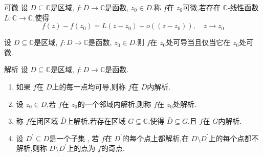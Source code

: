 \documentclass[../../复变函数.tex]{subfiles}
\begin{document}
\begin{definition}{可微}
    设 \(  D\subseteq \mathbb{C}   \)是区域, \(  f:D\to \mathbb{C}   \)是函数, \(  z_0 \in D  \).称 \(  f  \)在 \(  z_0  \)可微,若存在 \(  \mathbb{C}   \)-线性函数 \(  L:\mathbb{C} \to \mathbb{C}   \),使得 \[
    f\left( z \right)-f\left( z_0 \right)=  L\left( z-z_0 \right)+  o\left( \left( z-z_0 \right)  \right),\quad z\to z_0    
    \]    
       
\end{definition}

\begin{proposition}
    设 \(  D\subseteq \mathbb{C}   \)是区域, \(  f:D\to \mathbb{C}   \)是函数, \(  z_0 \in D  \).则 \(  f  \)在 \(  z_0  \)处可导当且仅当它在 \(  z_0  \)处可微.      
\end{proposition}

\begin{definition}{解析}
    设 \(  D\subseteq \mathbb{C}   \)是区域, \(  f:D\to \mathbb{C}   \)是函数.
    \begin{enumerate}
        \item 如果 \(  f  \)在 \(  D  \)上的每一点均可导,则称 \(  f  \)在 \(  D  \)内解析.
        \item 设 \(  z_0 \in D  \),若 \(  f  \)在 \(  z_0  \)的一个邻域内解析,则称 \(  f  \)在 \(  z_0  \)处解析.
        \item   称 \(  f  \)在闭区域 \(  \bar{D}  \)上解析,若存在区域 \(  G\subseteq \mathbb{C}   \),使得 \(  \bar{D}\subseteq G  \),且 \(  f  \)在 \(  G  \)内解析.    
        \item 设 \(  D^{\prime} \subseteq D  \)是一个子集      , 若 \(  f  \)在 \(  D^{\prime}   \)的每个点上都解析,在 \(  D\setminus D^{\prime}   \)上的每个点都不解析,则称 \(  D\setminus D^{\prime}   \)上的点为 \(  f  \)的奇点.     
    \end{enumerate}
          
\end{definition}
\end{document}
